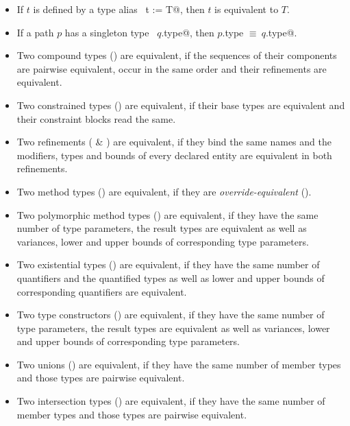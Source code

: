 \begin{itemize}
\item
If $t$ is defined by a type alias ~\lstinline@type t := T@, then $t$ is equivalent to $T$. 

\item
If a path $p$ has a singleton type ~\lstinline@$q$.type@, then \lstinline@$p$.type $\equiv\ q$.type@. 

\item
Two compound types () are equivalent, if the sequences of their components are pairwise equivalent, occur in the same order and their refinements are equivalent.

\item
Two constrained types () are equivalent, if their base types are equivalent and their constraint blocks read the same. 

\item
Two refinements ( \& ) are equivalent, if they bind the same names and the modifiers, types and bounds of every declared entity are equivalent in both refinements. 

\item
Two method types () are equivalent, if they are {\em override-equivalent} ().

\item
Two polymorphic method types () are equivalent, if they have the same number of type parameters, the result types are equivalent as well as variances, lower and upper bounds of corresponding type parameters. 

\item
Two existential types () are equivalent, if they have the same number of quantifiers and the quantified types as well as lower and upper bounds of corresponding quantifiers are equivalent. 

\item
Two type constructors () are equivalent, if they have the same number of type parameters, the result types are equivalent as well as variances, lower and upper bounds of corresponding type parameters. 

\item 
Two unions () are equivalent, if they have the same number of member types and those types are pairwise equivalent. 

\item 
Two intersection types () are equivalent, if they have the same number of member types and those types are pairwise equivalent. 

\end{itemize}






